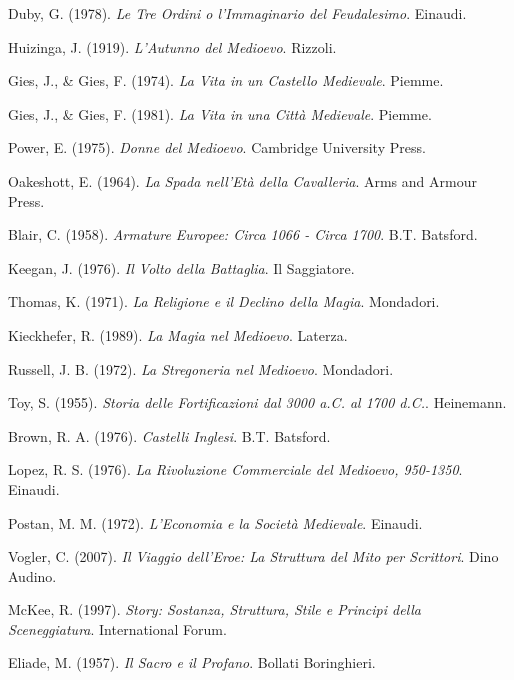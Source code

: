 Duby, G. (1978).
\textit{Le Tre Ordini o l'Immaginario del Feudalesimo}.
Einaudi.

Huizinga, J. (1919).
\textit{L'Autunno del Medioevo}.
Rizzoli.

Gies, J., \& Gies, F. (1974).
\textit{La Vita in un Castello Medievale}.
Piemme.

Gies, J., \& Gies, F. (1981).
\textit{La Vita in una Città Medievale}.
Piemme.

Power, E. (1975).
\textit{Donne del Medioevo}.
Cambridge University Press.

Oakeshott, E. (1964).
\textit{La Spada nell'Età della Cavalleria}.
Arms and Armour Press.

Blair, C. (1958).
\textit{Armature Europee: Circa 1066 - Circa 1700}.
B.T. Batsford.

Keegan, J. (1976).
\textit{Il Volto della Battaglia}.
Il Saggiatore.

Thomas, K. (1971).
\textit{La Religione e il Declino della Magia}.
Mondadori.

Kieckhefer, R. (1989).
\textit{La Magia nel Medioevo}.
Laterza.

Russell, J. B. (1972).
\textit{La Stregoneria nel Medioevo}.
Mondadori.

Toy, S. (1955).
\textit{Storia delle Fortificazioni dal 3000 a.C. al 1700 d.C.}.
Heinemann.

Brown, R. A. (1976).
\textit{Castelli Inglesi}.
B.T. Batsford.

Lopez, R. S. (1976).
\textit{La Rivoluzione Commerciale del Medioevo, 950-1350}.
Einaudi.

Postan, M. M. (1972).
\textit{L'Economia e la Società Medievale}.
Einaudi.

Vogler, C. (2007).
\textit{Il Viaggio dell'Eroe: La Struttura del Mito per Scrittori}.
Dino Audino.

McKee, R. (1997).
\textit{Story: Sostanza, Struttura, Stile e Principi della Sceneggiatura}.
International Forum.

Eliade, M. (1957).
\textit{Il Sacro e il Profano}.
Bollati Boringhieri.

